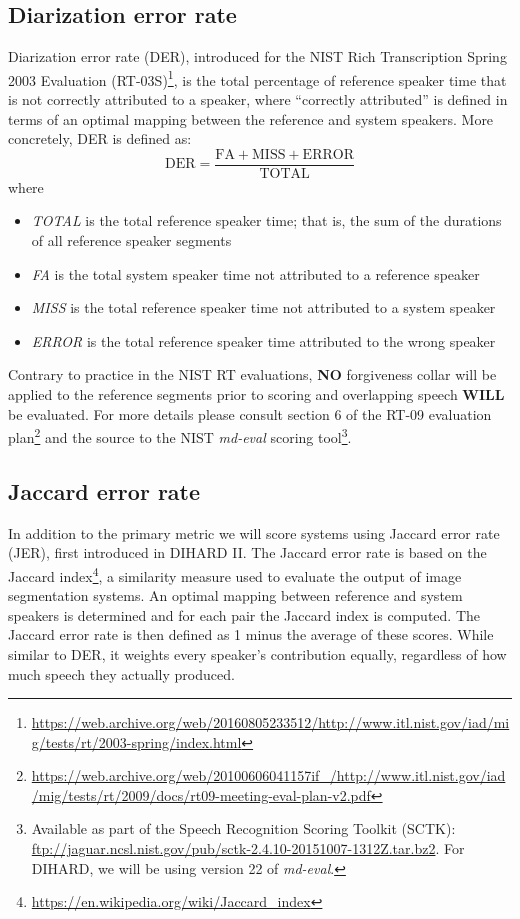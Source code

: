 \documentclass{article}
\begin{document}
\subsection{Diarization error rate}
Diarization error rate (DER), introduced for the NIST Rich Transcription Spring 2003 Evaluation (RT-03S)\footnote{\url{https://web.archive.org/web/20160805233512/http://www.itl.nist.gov/iad/mig/tests/rt/2003-spring/index.html}}, is the total percentage of reference speaker time that is not correctly attributed to a speaker, where ``correctly attributed'' is defined in terms of an optimal mapping between the reference and system speakers. More concretely, DER is defined as: 
\begin{equation*}
    \textrm{DER} = \frac{\textrm{FA} + \textrm{MISS} + \textrm{ERROR}}{\textrm{TOTAL}}
\end{equation*}
where
\begin{itemize}
    \item {\it TOTAL} is the total reference speaker time; that is, the sum of the durations of all reference speaker segments
    \item {\it FA} is the total system speaker time not attributed to a reference speaker
    \item {\it MISS} is the total reference speaker time not attributed to a system speaker
    \item {\it ERROR} is the total reference speaker time attributed to the wrong speaker
\end{itemize}
Contrary to practice in the NIST RT evaluations, {\bf NO} forgiveness collar will be applied to the reference segments prior to scoring and overlapping speech {\bf WILL} be evaluated. For more details please consult section 6 of the RT-09 evaluation plan\footnote{\url{https://web.archive.org/web/20100606041157if_/http://www.itl.nist.gov/iad/mig/tests/rt/2009/docs/rt09-meeting-eval-plan-v2.pdf}} and the source to the NIST {\it md-eval} scoring tool\footnote{Available as part of the Speech Recognition Scoring Toolkit (SCTK): \url{ftp://jaguar.ncsl.nist.gov/pub/sctk-2.4.10-20151007-1312Z.tar.bz2}. For DIHARD, we will be using version 22 of {\it md-eval}.}.


\subsection{Jaccard error rate}
In addition to the primary metric we will score systems using Jaccard error rate (JER), first introduced in DIHARD II. The Jaccard error rate is based on the Jaccard index\footnote{\url{https://en.wikipedia.org/wiki/Jaccard_index}}, a similarity measure used to evaluate the output of image segmentation systems. An optimal mapping between reference and system speakers is determined and for each pair the Jaccard index is computed. The Jaccard error rate is then defined as 1 minus the average of these scores. While similar to DER, it weights every speaker's contribution equally, regardless of how much speech they actually produced.
\end{document}
